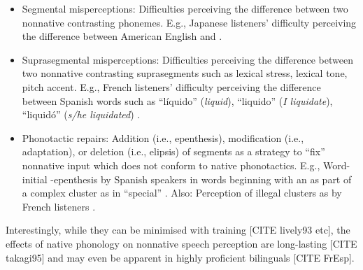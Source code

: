 \begin{itemize}
\item Segmental misperceptions: Difficulties perceiving the difference between two nonnative contrasting phonemes. E.g., Japanese listeners' difficulty perceiving the difference between American English  and  \cite{goto1991, miyawaki1981}.
\item Suprasegmental misperceptions: Difficulties perceiving the difference between two nonnative contrasting suprasegments such as lexical stress, lexical tone, pitch accent. E.g., French listeners' difficulty perceiving the difference between Spanish words such as ``líquido''  (\textit{liquid}), ``liquido''  (\textit{I liquidate}), ``liquidó''  (\textit{s/he liquidated}) \cite{dupoux1997, dupoux2008}.
\item Phonotactic repairs: Addition (i.e., epenthesis), modification (i.e., adaptation), or deletion (i.e., elipsis) of segments as a strategy to ``fix'' nonnative input which does not conform to native phonotactics. E.g., Word-initial -epenthesis by Spanish speakers in words beginning with an  as part of a complex cluster as in ``special'' \cite{halle2014}. Also: Perception of illegal  clusters as  by French listeners \cite{halle2007}.  
\end{itemize}

Interestingly, while they can be minimised with training [CITE lively93 etc], the effects of native phonology on nonnative speech perception are long-lasting [CITE takagi95] and may even be apparent in highly proficient bilinguals [CITE FrEsp].


